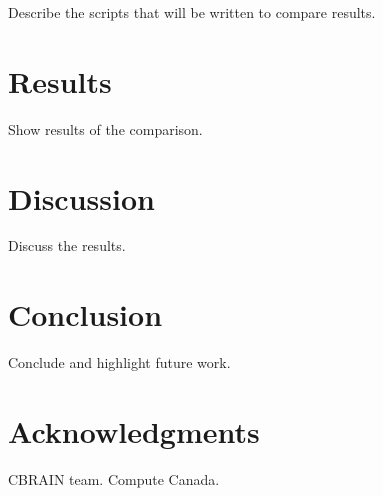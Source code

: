 \documentclass{article}
\begin{document}
Describe the scripts that will be written to compare results.

\section{Results}

Show results of the comparison.

\section{Discussion}

Discuss the results.

\section{Conclusion}

Conclude and highlight future work.

\section{Acknowledgments}

CBRAIN team. Compute Canada.



\end{document}
